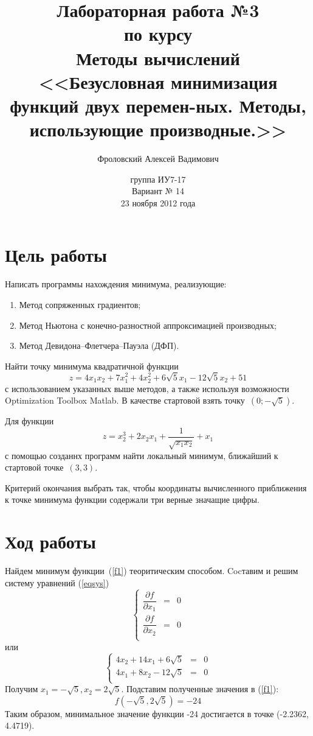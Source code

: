 \documentclass[12pt,a4paper,oneside]{report}
\title{Лабораторная работа №3\\по курсу\\Методы вычислений \\<<Безусловная минимизация функций двух перемен-ных. Методы, использующие производные.>>}
\author{Фроловский Алексей Вадимович}
\date{группа ИУ7-17 \\ Вариант № 14\\23 ноября 2012 года}
\begin{document}
\maketitle
\section*{Цель работы}
Написать программы нахождения минимума, реализующие:
\begin{enumerate}
\item Метод сопряженных градиентов;
\item Метод Ньютона с конечно-разностной аппроксимацией производных;
\item Метод Девидона–Флетчера–Пауэла (ДФП).
\end{enumerate}

Найти точку минимума квадратичной функции
\begin{equation}
\label{f1}
z = 4x_{1}x_{2}+7x^{2}_{1}+4x^{2}_{2}+6\sqrt{5}x_{1}-12\sqrt{5}x_{2}+51
\end{equation}
с использованием указанных выше методов, а также используя возможности Optimization Toolbox Matlab. В качестве стартовой взять точку~$(0;-\sqrt{5})$. 

Для функции 
\begin{equation}
\label{f2}
z = x^{3}_{2}+2x_{2}x_{1} + \frac{1}{\sqrt{x_{1}x_{2}}} + x_{1}
\end{equation}
с помощью созданнх программ найти локальный минимум, ближайший к стартовой точке~$(3, 3)$.

Критерий окончания выбрать так, чтобы координаты вычисленного приближения к
точке минимума функции содержали три верные значащие цифры.

\section*{Ход работы}
Найдем минимум функции~(\ref{f1}) теоритическим способом. Cocтавим и решим систему уравнений (\ref{eqsys})
\begin{equation}
\label{eqsys}
\left\{  
 	\begin{array}{rcl}  
           \dfrac{\partial{f}}{\partial{x_{1}}} & = & 0 \\  
           \dfrac{\partial{f}}{\partial{x_{2}}} & = & 0 \\  
           \end{array}   
 \right.
\end{equation}
или
\begin{equation}
\label{eqsysext}
\left\{  
 	\begin{array}{rcl}  
           4x_{2} + 14x_{1} + 6\sqrt{5} & = & 0 \\  
           4x_{1} + 8x_{2} - 12\sqrt{5} & = & 0 \\  
           \end{array}   
 \right.
\end{equation}
Получим $x_{1} = -\sqrt{5}, x_{2} = 2\sqrt{5}$. Подставим полученные значения  в (\ref{f1}):
\begin{equation}
f(-\sqrt{5},2\sqrt{5}) = -24
\end{equation}
Таким образом, минимальное значение функции -24 достигается в точке (-2.2362,  4.4719).
\end{document}
